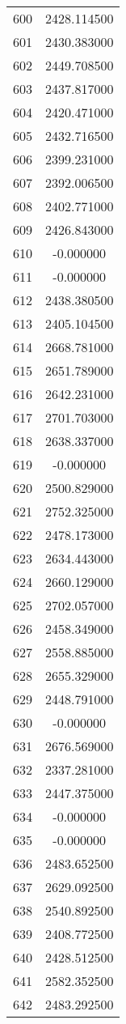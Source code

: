 \documentclass[12pt]{article}
\begin{document}
\begin{longtable}{@{}cc@{}}
600 & 2428.114500 \\
601 & 2430.383000 \\
602 & 2449.708500 \\
603 & 2437.817000 \\
604 & 2420.471000 \\
605 & 2432.716500 \\
606 & 2399.231000 \\
607 & 2392.006500 \\
608 & 2402.771000 \\
609 & 2426.843000 \\
610 & -0.000000 \\
611 & -0.000000 \\
612 & 2438.380500 \\
613 & 2405.104500 \\
614 & 2668.781000 \\
615 & 2651.789000 \\
616 & 2642.231000 \\
617 & 2701.703000 \\
618 & 2638.337000 \\
619 & -0.000000 \\
620 & 2500.829000 \\
621 & 2752.325000 \\
622 & 2478.173000 \\
623 & 2634.443000 \\
624 & 2660.129000 \\
625 & 2702.057000 \\
626 & 2458.349000 \\
627 & 2558.885000 \\
628 & 2655.329000 \\
629 & 2448.791000 \\
630 & -0.000000 \\
631 & 2676.569000 \\
632 & 2337.281000 \\
633 & 2447.375000 \\
634 & -0.000000 \\
635 & -0.000000 \\
636 & 2483.652500 \\
637 & 2629.092500 \\
638 & 2540.892500 \\
639 & 2408.772500 \\
640 & 2428.512500 \\
641 & 2582.352500 \\
642 & 2483.292500 \\

\end{longtable}
\end{document}
